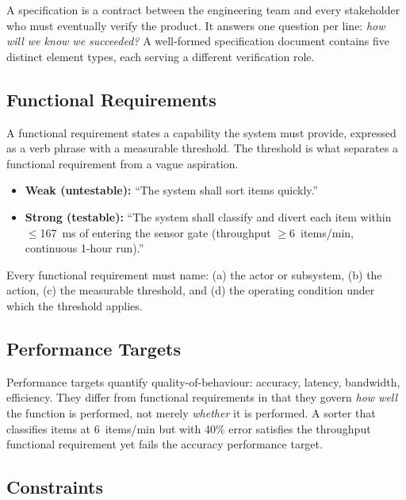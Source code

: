 A specification is a contract between the engineering team and every stakeholder who must eventually verify the product.
It answers one question per line: \emph{how will we know we succeeded?}
A well-formed specification document contains five distinct element types, each serving a different verification role.

\subsection{Functional Requirements}
\label{subsec:ch4-functional}

A functional requirement states a capability the system must provide, expressed as a verb phrase with a measurable threshold.
The threshold is what separates a functional requirement from a vague aspiration.

\begin{itemize}
  \item \textbf{Weak (untestable):} ``The system shall sort items quickly.''
  \item \textbf{Strong (testable):} ``The system shall classify and divert each item within $\leq$167~ms of entering the sensor gate (throughput $\geq$6~items/min, continuous 1-hour run).''
\end{itemize}

Every functional requirement must name: (a) the actor or subsystem, (b) the action, (c) the measurable threshold, and (d) the operating condition under which the threshold applies.

\subsection{Performance Targets}
\label{subsec:ch4-performance}

Performance targets quantify quality-of-behaviour: accuracy, latency, bandwidth, efficiency.
They differ from functional requirements in that they govern \emph{how well} the function is performed, not merely \emph{whether} it is performed.
A sorter that classifies items at 6~items/min but with 40\% error satisfies the throughput functional requirement yet fails the accuracy performance target.

\subsection{Constraints}
\label{subsec:ch4-constraints}


